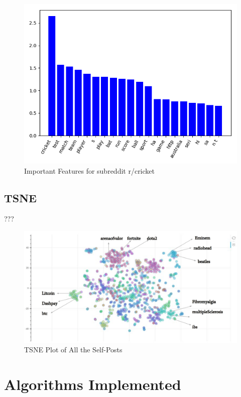 \documentclass{sig-alternate-05-2015}
\begin{document}
\begin{figure}[H]
\centering
\includegraphics[width=\linewidth]{plots/coefficients-cricket-dim-200.png}
\caption{Important Features for subreddit r/cricket}
\end{figure}

\subsection{TSNE} ???

\begin{figure}[H]
\centering
\includegraphics[width=\linewidth]{plots/tsne.png}
\caption{TSNE Plot of All the Self-Posts}
\end{figure}

\section{Algorithms Implemented}
\end{document}
